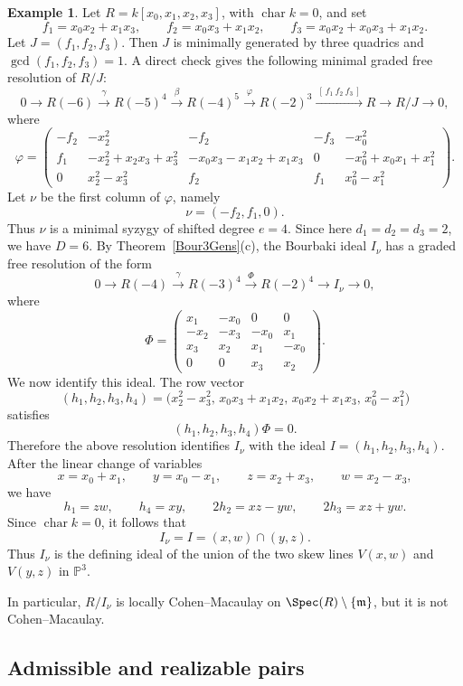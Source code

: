 \documentclass[11pt]{amsart} %
\theoremstyle{definition}
\newtheorem{Example}[Theorem]{Example}
\def\fm{{\mathfrak m}}
\def\fm{{\mathfrak m}}
\def\NZQ{\mathbb}               %
\def\PP{{\NZQ P}}
\begin{document}
\begin{Example}\label{ex:Bourbaki-skew-lines-not-CM}
Let $R=k[x_0,x_1,x_2,x_3]$, with $\operatorname{char}k=0$, and set
\[
f_1=x_0x_2+x_1x_3,\qquad
f_2=x_0x_3+x_1x_2,\qquad
f_3=x_0x_2+x_0x_3+x_1x_2.
\]
Let $J=(f_1,f_2,f_3)$. Then $J$ is minimally generated by three quadrics and
$\gcd(f_1,f_2,f_3)=1$. A direct check gives the following minimal graded free
resolution of $R/J$:
\[
0\to R(-6)\xrightarrow{\ \gamma\ }R(-5)^4\xrightarrow{\ \beta\ }R(-4)^5
\xrightarrow{\ \varphi\ }R(-2)^3\xrightarrow{\ [\,f_1\ f_2\ f_3\,]\ }R
\to R/J\to0,
\]
where
\[
\varphi=
\begin{pmatrix}
-f_2 & -x_2^2 & -f_2 & -f_3 & -x_0^2\\
f_1 & -x_2^2+x_2x_3+x_3^2 & -x_0x_3-x_1x_2+x_1x_3 & 0
& -x_0^2+x_0x_1+x_1^2\\
0 & x_2^2-x_3^2 & f_2 & f_1 & x_0^2-x_1^2
\end{pmatrix}.
\]
Let $\nu$ be the first column of $\varphi$, namely
\[
\nu=(-f_2,f_1,0).
\]
Thus $\nu$ is a minimal syzygy of shifted degree $e=4$. Since here
$d_1=d_2=d_3=2$, we have $D=6$. By Theorem~\ref{Bour3Gens}{\rm(c)}, the Bourbaki ideal $I_\nu$ has a graded free resolution of the form 
\[
0\to R(-4)\xrightarrow{\ \gamma\ }R(-3)^4\xrightarrow{\ \Phi\ }R(-2)^4
\to I_\nu\to0,
\]
where
\[
\Phi=
\begin{pmatrix}
x_1 & -x_0 & 0 & 0\\
-x_2 & -x_3 & -x_0 & x_1\\
x_3 & x_2 & x_1 & -x_0\\
0 & 0 & x_3 & x_2
\end{pmatrix}.
\]
We now identify this ideal. The row vector
\[
(h_1,h_2,h_3,h_4)
=
\bigl(
x_2^2-x_3^2,\,
x_0x_3+x_1x_2,\,
x_0x_2+x_1x_3,\,
x_0^2-x_1^2
\bigr)
\]
satisfies
\[
(h_1,h_2,h_3,h_4)\Phi=0.
\]
Therefore the above resolution identifies $I_\nu$ with the ideal $I=(h_1,h_2,h_3,h_4)$. After the linear change of variables
\[
x=x_0+x_1,\qquad y=x_0-x_1,\qquad z=x_2+x_3,\qquad w=x_2-x_3,
\]
we have
\[
h_1=zw,\qquad h_4=xy,\qquad 2h_2=xz-yw,\qquad 2h_3=xz+yw.
\]
Since $\operatorname{char}k=0$, it follows that
\[
I_\nu=I=(x,w)\cap(y,z).
\]
Thus $I_\nu$ is the defining ideal of the union of the two skew lines
$V(x,w)$ and $V(y,z)$ in $\PP^3$.

In particular, $R/I_\nu$ is locally Cohen--Macaulay on
$\Spec(R)\setminus\{\fm\}$, but it is not Cohen--Macaulay. 
\end{Example}

\subsection{Admissible and realizable pairs}
\end{document}
